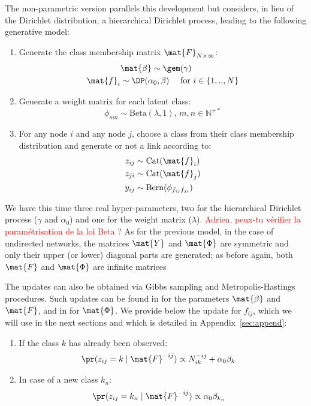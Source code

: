 The non-parametric version parallels this development but considers, in lieu of the Dirichlet distribution, a hierarchical Dirichlet process, leading to the following generative model:
%
\begin{enumerate}
\item Generate the class membership matrix $\mat{F}_{N \times \infty}$:
   \begin{align}
    &\mathbf{\mat{\beta}} \sim \gem(\gamma) \nonumber \\
    \mat{f}_i &\sim \DP(\alpha_0, \beta) \quad\text{ for }  i \in \{1, .., N\} \nonumber
   \end{align}
\item Generate a weight matrix for each latent class:\\
\[ \phi_{mn} \sim \mathrm{Beta}(\lambda,1), \, m,n \in \mathbb{N}^{+*} \]
\item For any node $i$ and any node $j$, choose a class from their class membership distribution and generate or not a link according to:
   \begin{align}
    z_{ij} &\sim \mbox{Cat}(\mat{f}_i) \nonumber \\
    z_{ji} &\sim \mbox{Cat}(\mat{f}_j) \nonumber \\
    y_{ij} &\sim \mathrm{Bern}(\phi_{f_{ij}f_{ji}})
    \label{eq:link-immsb}
   \end{align}
\end{enumerate}
%
We have this time three real hyper-parameters, two for the hierarchical Dirichlet process ($\gamma$ and $\alpha_0$) and one for the weight matrix ($\lambda$).
\textcolor{red}{Adrien, peux-tu v\'erifier la param\'etrisation de la loi Beta ?}
As for the previous model, in the case of undirected networks, the matrices $\mat{Y}$ and $\mat{\Phi}$ are symmetric and only their upper (or lower) diagonal parts are generated; as before again, both $\mat{F}$ and $\mat{\Phi}$ are infinite matrices

The updates can also be obtained via Gibbs sampling and Metropolis-Hastings procedures. Such updates can be found in \cite{HDP} for the parameters $\mat{\beta}$ and $\mat{F}$, and in \cite{MMSB} for $\mat{\Phi}$. We provide below the update for $f_{ij}$, which we will use in the next sections and which is detailed in Appendix~\ref{sec:append}:
%
\begin{enumerate}
\item If the class $k$ has already been observed:
   \begin{align}
    \pr(z_{ij} =k \mid \mat{F}^{-ij}) &\propto N_{ik}^{-ij} + \alpha_0 \beta_k
    \label{eq:update-immsb}
   \end{align}
\item In case of a new class $k_n$:
   \begin{align}
    \pr(z_{ij} =k_n \mid \mat{F}^{-ij}) &\propto \alpha_0 \beta_{k_n} \nonumber
   \end{align}
\end{enumerate}


